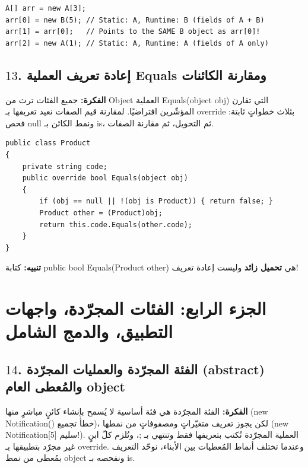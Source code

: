 \documentclass[14pt]{extarticle}
\begin{document}
\begin{boxCode}
\begin{english}
\begin{verbatim}
A[] arr = new A[3];
arr[0] = new B(5); // Static: A, Runtime: B (fields of A + B)
arr[1] = arr[0];   // Points to the SAME B object as arr[0]!
arr[2] = new A(1); // Static: A, Runtime: A (fields of A only)
\end{verbatim}
\end{english}
\end{boxCode}

\filbreak
\subsection*{$13$. إعادة تعريف العملية \textenglish{Equals} ومقارنة الكائنات}
\textbf{الفكرة:} جميع الفئات ترث من \textenglish{Object} العملية \textenglish{Equals(object obj)} التي تقارن المؤشّرين افتراضيًا. لمقارنة قيم الصفات نعيد تعريفها بـ \textenglish{override} بثلاث خطواتٍ ثابتة: فحص \textenglish{null} ونمط الكائن بـ \textenglish{is}، ثم التحويل، ثم مقارنة الصفات.

\begin{boxCode}
\begin{english}
\begin{verbatim}
public class Product
{
    private string code;
    public override bool Equals(object obj)
    {
        if (obj == null || !(obj is Product)) { return false; }
        Product other = (Product)obj;
        return this.code.Equals(other.code);
    }
}
\end{verbatim}
\end{english}
\end{boxCode}

\textbf{تنبيه:} كتابة \textenglish{public bool Equals(Product other)} هي \textbf{تحميل زائد} وليست إعادة تعريف!

\clearpage
\section*{الجزء الرابع: الفئات المجرّدة، واجهات التطبيق، والدمج الشامل}

\subsection*{$14$. الفئة المجرّدة والعمليات المجرّدة (\textenglish{abstract}) والمُعطى العام \textenglish{object}}
\textbf{الفكرة:} الفئة المجرّدة هي فئة أساسية لا يُسمح بإنشاء كائنٍ مباشرٍ منها (\textenglish{new Notification()} خطأ تجميع)، لكن يجوز تعريف متغيّراتٍ ومصفوفاتٍ من نمطها (\textenglish{new Notification[5]} سليم!). العملية المجرّدة تُكتب بتعريفها فقط وتنتهي بـ \textenglish{;}، وتُلزم كلّ ابنٍ غير مجرّد بتطبيقها بـ \textenglish{override}. وعندما تختلف أنماط المُعطيات بين الأبناء، نوحّد التعريف بمُعطى من نمط \textenglish{object} ونفحصه بـ \textenglish{is}.
\end{document}
